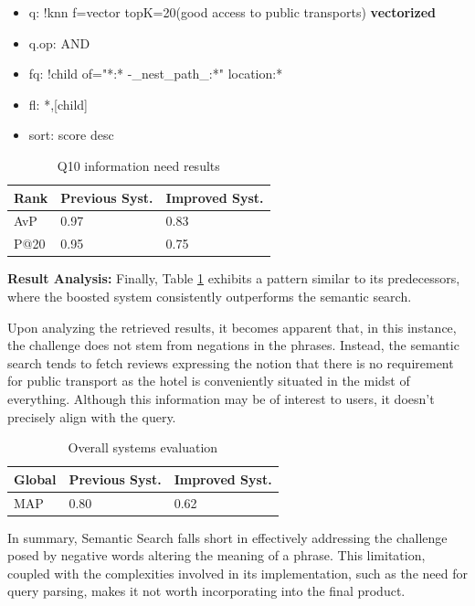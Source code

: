 \documentclass[sigconf]{acmart}
\begin{document}
\begin{itemize}
    \item q: {!knn f=vector topK=20}(good access to public transports) \textbf{vectorized}
    \item q.op: AND
    \item fq: {!child of="*:* -\_nest\_path\_:*"} location:*
    \item fl: *,[child]
    \item sort: score desc
\end{itemize}

\begin{table}[H]
\caption{Q10 information need results}
\label{tab:q10}
\begin{tabular}{lll}
\toprule
Rank & Previous Syst. & Improved Syst.\\
\midrule
AvP & 0.97 & 0.83  \\
P@20 & 0.95 & 0.75 \\
\bottomrule
\end{tabular}
\end{table}

\textbf{Result Analysis:} Finally, Table \ref{tab:q10} exhibits a pattern similar to its predecessors, where the boosted system consistently outperforms the semantic search.

Upon analyzing the retrieved results, it becomes apparent that, in this instance, the challenge does not stem from negations in the phrases. Instead, the semantic search tends to fetch reviews expressing the notion that there is no requirement for public transport as the hotel is conveniently situated in the midst of everything. Although this information may be of interest to users, it doesn't precisely align with the query.


\begin{table}[H]
\caption{Overall systems evaluation}
\label{tab:map_semantic}
\begin{tabular}{lll}
\toprule
Global & Previous Syst. & Improved Syst.\\
\midrule
MAP & 0.80 & 0.62  \\ 

\bottomrule
\end{tabular}
\end{table}


In summary, Semantic Search falls short in effectively addressing the challenge posed by negative words altering the meaning of a phrase. This limitation, coupled with the complexities involved in its implementation, such as the need for query parsing, makes it not worth incorporating into the final product.
\end{document}
